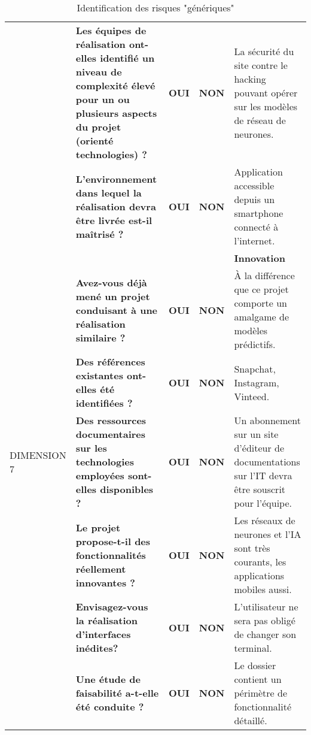 \documentclass[12pt]{article}
\begin{document}
\begin{landscape}
\begin{table}[H]
{\begin{tabular}{p{2cm}p{}p{1cm}p{1cm}p{12.25cm}}
\cellcolor{blue!50} & \bf Les équipes de réalisation ont-elles identifié un niveau de complexité élevé pour un ou plusieurs aspects du projet (orienté technologies) ? & \bf OUI \cellcolor{green!50}& \bf NON\cellcolor{red!50} & La sécurité du site contre le hacking pouvant opérer sur les modèles de réseau de neurones. \\
\cellcolor{blue!50} & \bf L’environnement dans lequel la réalisation devra être livrée est-il maîtrisé ? & \bf OUI \cellcolor{green!50}& \bf NON\cellcolor{red!50} & Application accessible depuis un smartphone connecté à l’internet. \\
\hline \cellcolor{blue!70}& \cellcolor{blue!70}& \cellcolor{blue!70}& \cellcolor{blue!70}&\bf Innovation \cellcolor{blue!70}\\
\cellcolor{blue!70} & \bf Avez-vous déjà mené un projet conduisant à une réalisation similaire ? & \bf OUI \cellcolor{green!50}& \bf NON\cellcolor{red!50} & À la différence que ce projet comporte un amalgame de modèles prédictifs. \\
\cellcolor{blue!70} & \bf Des références existantes ont-elles été identifiées ? & \bf OUI \cellcolor{green!50}& \bf NON\cellcolor{red!50} & Snapchat, Instagram, Vinteed. \\
DIMENSION 7\cellcolor{blue!70} & \bf Des ressources documentaires sur les technologies employées sont-elles disponibles ? & \bf OUI \cellcolor{green!50}& \bf NON\cellcolor{red!50} & Un abonnement sur un site d’éditeur de documentations sur l’IT devra être souscrit pour l’équipe. \\
\cellcolor{blue!70} & \bf Le projet propose-t-il des fonctionnalités réellement innovantes ? & \bf OUI \cellcolor{red!50}& \bf NON\cellcolor{green!50} & Les réseaux de neurones et l’IA sont très courants, les applications mobiles aussi. \\
\cellcolor{blue!70} & \bf Envisagez-vous la réalisation d’interfaces inédites? & \bf OUI \cellcolor{red!50}& \bf NON\cellcolor{green!50} & L’utilisateur ne sera pas obligé de changer son terminal. \\
\cellcolor{blue!70} & \bf Une étude de faisabilité a-t-elle été conduite ? & \bf OUI \cellcolor{green!50}& \bf NON\cellcolor{red!50} & Le dossier contient un périmètre de fonctionnalité détaillé. \\



\hline
\end{tabular}
}
\caption{Identification des risques "génériques"}
\label{identifier_les_risques}

\end{table}

\end{landscape}
\end{document}
